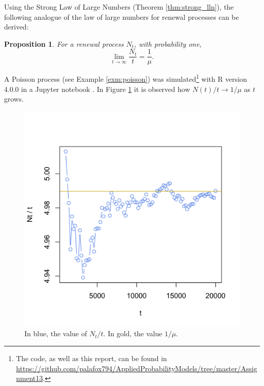 \documentclass[letterpaper, 10 pt, conference]{article}
\newtheorem{prop}{Proposition}
\begin{document}
Using the Strong Law of Large Numbers (Theorem \ref{thm:strong_lln}), the following analogue of the law of large numbers for renewal processes can be derived:

\begin{prop}
	For a renewal process $N_t$, with probability one,
	\begin{equation}
		\lim_{t \rightarrow \infty} \frac{N_t}{t} = \frac{1}{\mu}.
	\end{equation}
\end{prop}

A Poisson process (see Example \ref{exm:poisson}) was simulated\footnote{The code, as well as this report, can be found in \url{https://github.com/palafox794/AppliedProbabilityModels/tree/master/Assignment13}.} with R version 4.0.0 in a Jupyter notebook \citep{R, jupyter}. In Figure \ref{fig:lln} it is observed how $N(t)/t \rightarrow 1/\mu$ as $t$ grows.

\begin{figure}
	\centering
	\includegraphics[width = .5 \linewidth]{lln.png}
	\caption{In blue, the value of $N_t / t$. In gold, the value $1/\mu$.}
	\label{fig:lln}
\end{figure}
\end{document}
